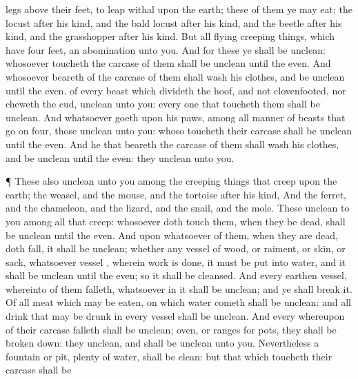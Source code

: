 {legs
above their
feet, to
leap
withal upon the
earth;
 these of them ye may
eat; the
locust after his
kind, and the bald
locust after his
kind, and the
beetle after his
kind, and the
grasshopper after his
kind.
But all
{}
flying creeping
things, which have
four
feet,
{} an
abomination unto you.
And for these ye shall be
unclean: whosoever
toucheth the
carcase of them shall be
unclean until the
even.
And whosoever
beareth
{} of the
carcase of them shall
wash his
clothes, and be
unclean until the
even.
 of every
beast which
divideth the
hoof, and
{} not
clovenfooted, nor
cheweth the
cud,
{}
unclean unto you: every one that
toucheth them shall be
unclean.
And
whatsoever
goeth upon his
paws, among all manner of
beasts that
go on
{}
four, those
{}
unclean unto you: whoso
toucheth their
carcase shall be
unclean until the
even.
And he that
beareth the
carcase of them shall
wash his
clothes, and be
unclean until the
even: they
{}
unclean unto you.
\par }{\PP {}¶ These also
{}
unclean unto you among the creeping
things that
creep upon the
earth; the
weasel, and the
mouse, and the
tortoise after his
kind,
And the
ferret, and the
chameleon, and the
lizard, and the
snail, and the
mole.
These
{}
unclean to you among all that
creep: whosoever doth
touch them, when they be
dead, shall be
unclean until the
even.
And upon whatsoever
{} of them, when they are
dead, doth
fall, it shall be
unclean; whether
{} any
vessel of
wood, or
raiment, or
skin, or
sack, whatsoever
vessel
{}, wherein
{}
work is
done, it must be
put into
water, and it shall be
unclean until the
even; so it shall be
cleansed.
And every
earthen
vessel, whereinto
{} of them
falleth, whatsoever
{} in it shall be
unclean; and ye shall
break it.
Of all
meat which may be
eaten,
{} on which
{}
water
cometh shall be
unclean: and all
drink that may be
drunk in every
{}
vessel shall be
unclean.
And every
{} whereupon
{} of their
carcase
falleth shall be
unclean;
{}
oven, or
ranges for pots, they shall be broken
down:
{} they
{}
unclean, and shall be
unclean unto you.
Nevertheless a
fountain or
pit,
{}
plenty of
water, shall be
clean: but that which
toucheth their
carcase shall be
}
